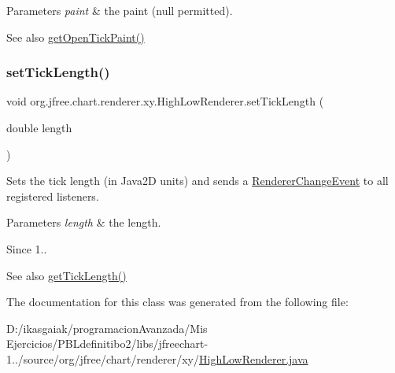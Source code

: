 \begin{DoxyParams}{Parameters}
{\em paint} & the paint ({\ttfamily null} permitted).\\
\hline
\end{DoxyParams}
\begin{DoxySeeAlso}{See also}
\mbox{\hyperlink{classorg_1_1jfree_1_1chart_1_1renderer_1_1xy_1_1_high_low_renderer_aa1736c9fa4a2ca796213ac10998f7539}{get\+Open\+Tick\+Paint()}} 
\end{DoxySeeAlso}
\mbox{\label{classorg_1_1jfree_1_1chart_1_1renderer_1_1xy_1_1_high_low_renderer_a1194fdcfc70ded6eed708d56d96b0d8b}} 
\subsubsection{\texorpdfstring{set\+Tick\+Length()}{setTickLength()}}
{\footnotesize\ttfamily void org.\+jfree.\+chart.\+renderer.\+xy.\+High\+Low\+Renderer.\+set\+Tick\+Length (\begin{DoxyParamCaption}\item[{double}]{length }\end{DoxyParamCaption})}

Sets the tick length (in Java2D units) and sends a \mbox{\hyperlink{}{Renderer\+Change\+Event}} to all registered listeners.


\begin{DoxyParams}{Parameters}
{\em length} & the length.\\
\hline
\end{DoxyParams}
\begin{DoxySince}{Since}
1..
\end{DoxySince}
\begin{DoxySeeAlso}{See also}
\mbox{\hyperlink{classorg_1_1jfree_1_1chart_1_1renderer_1_1xy_1_1_high_low_renderer_a4ffbe156619ad52c131b2b946f109234}{get\+Tick\+Length()}} 
\end{DoxySeeAlso}


The documentation for this class was generated from the following file\+:\begin{DoxyCompactItemize}
\item 
D\+:/ikasgaiak/programacion\+Avanzada/\+Mis Ejercicios/\+P\+B\+Ldefinitibo2/libs/jfreechart-\/1../source/org/jfree/chart/renderer/xy/\mbox{\hyperlink{_high_low_renderer_8java}{High\+Low\+Renderer.\+java}}\end{DoxyCompactItemize}
